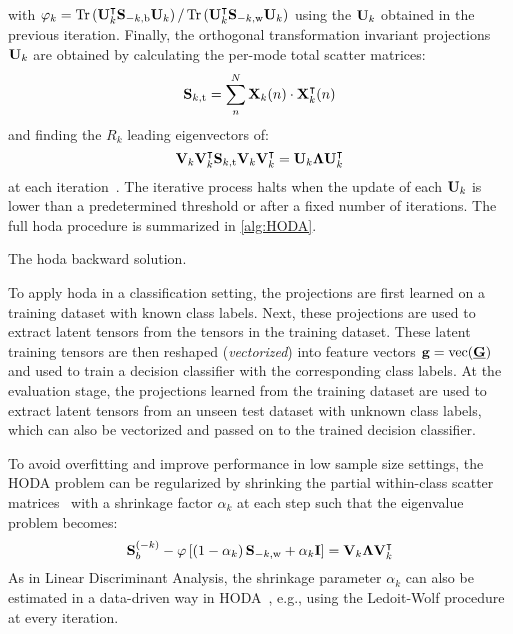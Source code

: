 \documentclass[twocolumn]{article}
\begin{document}
with $\varphi_k=\mathop{\mathrm{Tr}}\left(\mathbf{U}_k^\intercal\mathbf{S}_{-k,\text{b}}\mathbf{U}_k\right)/\mathop{\mathrm{Tr}}\left(\mathbf{U}_k^\intercal\mathbf{S}_{-k,\text{w}}\mathbf{U}_k\right)$
using the $\mathbf{U}_k$ obtained in the previous iteration.
Finally, the orthogonal transformation invariant projections $\mathbf{U}_k$
are obtained by calculating the
per-mode total scatter matrices:
\begin{equation}
	\mathbf{S}_{k,\text{t}} = \sum_n^N\mathbf{X}_k(n)\cdot\mathbf{X}_k^\intercal(n)
\end{equation}
and finding the $R_k$ leading eigenvectors of:
\begin{equation}
	\mathbf{V}_k\mathbf{V}_k^\intercal\mathbf{S}_{k,\text{t}}\mathbf{V}_k\mathbf{V}_k^\intercal
	= \mathbf{U}_k\mathbf{\Lambda}\mathbf{U}_k^\intercal
\end{equation}
at each iteration~\cite{Wang2007}.
The iterative process halts when the
update of each $\mathbf{U}_k$ is lower than a predetermined threshold or after a
fixed number of iterations.
The full \ac{hoda} procedure is summarized in \cref{alg:HODA}.
\begin{algorithm}
	\caption[A \acs{hoda} backward solution.]{The \acs{hoda} backward solution.}
	\label{alg:HODA}
	
\end{algorithm}

To apply \ac{hoda} in a classification setting, the projections
are first learned on a training dataset with known class labels.
Next, these projections are used to extract latent tensors from the
tensors in the training dataset.
These latent training tensors are then reshaped (\emph{vectorized}) into feature vectors
$\mathbf{g} =  \mathop{\mathrm{vec}}(\underline{\mathbf{G}})$ and used to train a decision classifier with the corresponding class labels.
At the evaluation stage, the projections learned from the training dataset are
used to extract latent tensors from an unseen test dataset with unknown class
labels, which can also be vectorized and passed on to the trained decision
classifier.

To avoid overfitting and improve performance in low sample size settings, the
HODA problem can be regularized by shrinking the partial
within-class scatter matrices~\cite{Phan2010} with a shrinkage factor
$\alpha_k$ at each step such that the eigenvalue problem becomes:
\begin{equation}
	\mathbf{S}_b^{(-k)} -
	\varphi\left[\left(1-\alpha_k\right)\mathbf{S}_{-k,\text{w}}+\alpha_k\mathbf{I}\right] =
	\mathbf{V}_k\mathbf{\Lambda}\mathbf{V}_k^\intercal
\end{equation}
As in Linear Discriminant Analysis, the shrinkage parameter $\alpha_k$ can
also be estimated in a data-driven way in HODA~\cite{Jorajuria2022},
e.g., using the Ledoit-Wolf procedure~\cite{Ledoit2003} at every iteration.
\end{document}
